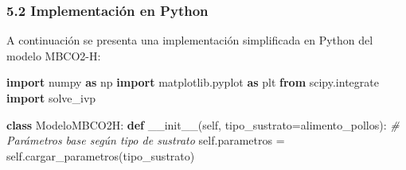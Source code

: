 \documentclass[
]{article}
\newenvironment{Shaded}{}{}
\newcommand{\CommentTok}[1]{\textcolor[rgb]{0.38,0.63,0.69}{\textit{#1}}}
\newcommand{\FunctionTok}[1]{\textcolor[rgb]{0.02,0.16,0.49}{#1}}
\newcommand{\ImportTok}[1]{\textcolor[rgb]{0.00,0.50,0.00}{\textbf{#1}}}
\newcommand{\KeywordTok}[1]{\textcolor[rgb]{0.00,0.44,0.13}{\textbf{#1}}}
\newcommand{\NormalTok}[1]{#1}
\newcommand{\OperatorTok}[1]{\textcolor[rgb]{0.40,0.40,0.40}{#1}}
\newcommand{\StringTok}[1]{\textcolor[rgb]{0.25,0.44,0.63}{#1}}
\newcommand{\VariableTok}[1]{\textcolor[rgb]{0.10,0.09,0.49}{#1}}
\begin{document}
\subsubsection{5.2 Implementación en
Python}\label{implementaciuxf3n-en-python}

A continuación se presenta una implementación simplificada en Python del
modelo MBCO2-H:

\begin{Shaded}
\begin{Highlighting}[]
\ImportTok{import}\NormalTok{ numpy }\ImportTok{as}\NormalTok{ np}
\ImportTok{import}\NormalTok{ matplotlib.pyplot }\ImportTok{as}\NormalTok{ plt}
\ImportTok{from}\NormalTok{ scipy.integrate }\ImportTok{import}\NormalTok{ solve\_ivp}

\KeywordTok{class}\NormalTok{ ModeloMBCO2H:}
    \KeywordTok{def} \FunctionTok{\_\_init\_\_}\NormalTok{(}\VariableTok{self}\NormalTok{, tipo\_sustrato}\OperatorTok{=}\StringTok{\textquotesingle{}alimento\_pollos\textquotesingle{}}\NormalTok{):}
        \CommentTok{\# Parámetros base según tipo de sustrato}
        \VariableTok{self}\NormalTok{.parametros }\OperatorTok{=} \VariableTok{self}\NormalTok{.cargar\_parametros(tipo\_sustrato)}
        

\end{Highlighting}
\end{Shaded}
\end{document}
